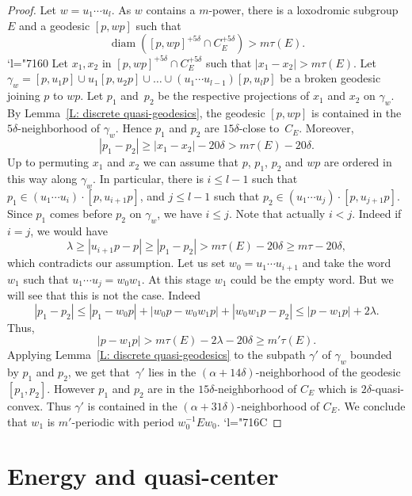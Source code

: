 \documentclass[JEP,XML,SOM,Unicode, NoEqCountersInSection,published]{cedram}
\newcommand{\Changel}{\mathcode`l="7160}
\newcommand{\Changelback}{\mathcode`l="716C}
\theoremstyle{plain}
\theoremstyle{definition}
\DeclareMathOperator{\diam}{diam}
\begin{document}
\begin{proof}
Let $w=u_1\cdots u_l$.
As $w$ contains a $m$-power, there is a loxodromic subgroup~$E$ and a geodesic $[p,wp]$ such that
\[
\diam([p,wp]^{+5\delta} \cap C_E^{+5\delta}) > m \tau(E).
\]
\Changel
Let $x_1, x_2$ in $[p,wp]^{+5\delta} \cap C_E^{+5\delta}$ such that $|x_1 - x_2| > m \tau(E)$.
Let $\gamma_w= [p,u_1p] \cup u_1[p,u_2p] \cup \ldots \cup (u_1\cdots u_{l-1})[p,u_lp]$ be a broken geodesic joining $p$ to $wp$.
Let $p_1$ and~$p_2$ be the respective projections of $x_1$ and $x_2$ on $\gamma_w$.
By Lemma~\ref{L: discrete quasi-geodesics}, the geodesic $[p,wp]$ is contained in the $5\delta$-neighborhood of $\gamma_w$.
Hence $p_1$ and $p_2$ are $15\delta$-close to~$C_E$.
Moreover,
\[
|p_1 -p_2| \geqslant |x_1-x_2| - 20\delta > m \tau(E) - 20\delta.
\]
Up to permuting $x_1$ and $x_2$ we can assume that $p$, $p_1$, $p_2$ and $wp$ are ordered in this way along $\gamma_w$.
In particular, there is $i \leqslant l-1$ such that $p_1 \in (u_1\cdots u_i) \cdot [ p, u_{i+1} p]$, and $j\leqslant l-1$ such that $p_2 \in (u_1\cdots u_j) \cdot [ p, u_{j+1} p]$.
Since $p_1$ comes before $p_2$ on $\gamma_w$, we have $i \leq j$.
Note that actually $i < j$.
Indeed if $i=j$, we would have
\begin{equation*}
\lambda \geq |u_{i+1}p -p| \geq |p_1-p_2| > m \tau(E) - 20\delta \geq m\tau - 20\delta,
\end{equation*}
which contradicts our assumption.
Let us set $w_0=u_1\cdots u_{i+1}$ and take the word $w_1$ such that $u_1\cdots u_j = w_0w_1 $.
At this stage $w_1$ could be the empty word.
But we will see that this is not the case.
Indeed
\[
|p_1 -p_2| \leqslant |p_1 - w_0p| + |w_0p-w_0w_1p| + |w_0w_1p-p_2| \leqslant |p-w_1p|+2\lambda.
\]
Thus,
\[
|p-w_1p|>
m \tau(E) -2 \lambda - 20\delta
\geq m' \tau(E).
\]
Applying Lemma~\ref{L: discrete quasi-geodesics} to the subpath $\gamma'$ of $\gamma_w$ bounded by $p_1$ and $p_2$, we get that~$\gamma'$ lies in the $(\alpha + 14\delta)$-neighborhood of the geodesic $[p_1, p_2]$.
However $p_1$ and $p_2$ are in the $15\delta$-neighborhood of $C_E$ which is $2\delta$-quasi-convex.
Thus $\gamma'$ is contained in the $(\alpha +31\delta)$-neighborhood of $C_E$.
We conclude that $w_1$ is $m'$-periodic with period $w_0^{-1}Ew_0$.
\Changelback
\end{proof}

\section{Energy and quasi-center}
\end{document}
